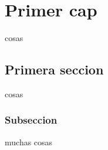 
\chapter{Primer cap}


cosas


\section{Primera seccion}


cosas


\subsection{Subseccion}


muchas cosas